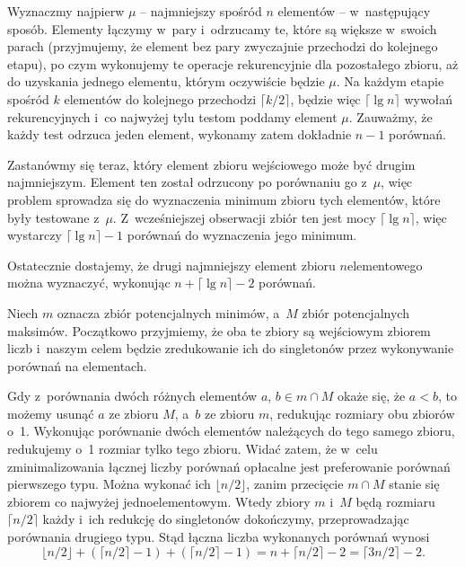 
\exercise %
Wyznaczmy najpierw $\mu$ -- najmniejszy spośród $n$ elementów -- w~następujący sposób.
Elementy łączymy w~pary i~odrzucamy te, które są większe w~swoich parach (przyjmujemy, że element bez pary zwyczajnie przechodzi do kolejnego etapu), po czym wykonujemy te operacje rekurencyjnie dla pozostałego zbioru, aż do uzyskania jednego elementu, którym oczywiście będzie $\mu$.
Na każdym etapie spośród $k$ elementów do kolejnego przechodzi $\lceil k/2\rceil$, będzie więc $\lceil\lg n\rceil$ wywołań rekurencyjnych i~co najwyżej tylu testom poddamy element $\mu$.
Zauważmy, że każdy test odrzuca jeden element, wykonamy zatem dokładnie $n-1$ porównań.

Zastanówmy się teraz, który element zbioru wejściowego może być drugim najmniejszym.
Element ten został odrzucony po porównaniu go z~$\mu$, więc problem sprowadza się do wyznaczenia minimum zbioru tych elementów, które były testowane z~$\mu$.
Z~wcześniejszej obserwacji zbiór ten jest mocy $\lceil\lg n\rceil$, więc wystarczy $\lceil\lg n\rceil-1$ porównań do wyznaczenia jego minimum.

Ostatecznie dostajemy, że drugi najmniejszy element zbioru $n$\nbhyphen elementowego można wyznaczyć, wykonując $n+\lceil\lg n\rceil-2$ porównań.

\exercise %
Niech $m$ oznacza zbiór potencjalnych minimów, a~$M$ zbiór potencjalnych maksimów.
Początkowo przyjmiemy, że oba te zbiory są wejściowym zbiorem liczb i~naszym celem będzie zredukowanie ich do singletonów przez wykonywanie porównań na elementach.

Gdy z~porównania dwóch różnych elementów $a$, $b\in m\cap M$ okaże się, że $a<b$, to możemy usunąć $a$ ze zbioru $M$, a~$b$ ze zbioru $m$, redukując rozmiary obu zbiorów o~1.
Wykonując porównanie dwóch elementów należących do tego samego zbioru, redukujemy o~1 rozmiar tylko tego zbioru.
Widać zatem, że w~celu zminimalizowania łącznej liczby porównań opłacalne jest preferowanie porównań pierwszego typu.
Można wykonać ich $\lfloor n/2\rfloor$, zanim przecięcie $m\cap M$ stanie się zbiorem co najwyżej jednoelementowym.
Wtedy zbiory $m$ i~$M$ będą rozmiaru $\lceil n/2\rceil$ każdy i~ich redukcję do singletonów dokończymy, przeprowadzając porównania drugiego typu.
Stąd łączna liczba wykonanych porównań wynosi
\[
    \lfloor n/2\rfloor+(\lceil n/2\rceil-1)+(\lceil n/2\rceil-1) = n+\lceil n/2\rceil-2 = \lceil3n/2\rceil-2.
\]
